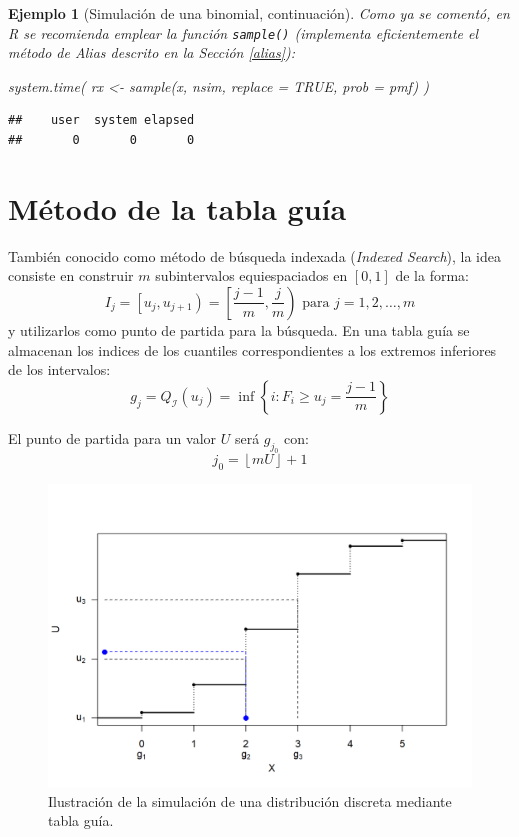 \documentclass[
]{book}
\newenvironment{Shaded}{\begin{snugshade}}{\end{snugshade}}
\newcommand{\AttributeTok}[1]{\textcolor[rgb]{0.77,0.63,0.00}{#1}}
\newcommand{\ConstantTok}[1]{\textcolor[rgb]{0.00,0.00,0.00}{#1}}
\newcommand{\FunctionTok}[1]{\textcolor[rgb]{0.00,0.00,0.00}{#1}}
\newcommand{\NormalTok}[1]{#1}
\newcommand{\OtherTok}[1]{\textcolor[rgb]{0.56,0.35,0.01}{#1}}
\theoremstyle{break}
\newtheorem{example}{Ejemplo}[chapter]
\theoremstyle{nonumberplain}
\begin{document}
\begin{example}[Simulación de una binomial, continuación]
Como ya se comentó, en R se recomienda emplear la función \texttt{sample()}
(implementa eficientemente el método de Alias descrito en la Sección \ref{alias}):

\begin{Shaded}
\begin{Highlighting}[]
\FunctionTok{system.time}\NormalTok{( rx }\OtherTok{\textless{}{-}} \FunctionTok{sample}\NormalTok{(x, nsim, }\AttributeTok{replace =} \ConstantTok{TRUE}\NormalTok{, }\AttributeTok{prob =}\NormalTok{ pmf) )}
\end{Highlighting}
\end{Shaded}

\begin{verbatim}
##    user  system elapsed 
##       0       0       0
\end{verbatim}

\end{example}

\hypertarget{muxe9todo-de-la-tabla-guuxeda}{%
\section{Método de la tabla guía}\label{muxe9todo-de-la-tabla-guuxeda}}

También conocido como método de búsqueda indexada (\emph{Indexed Search}), la idea consiste en construir \(m\) subintervalos equiespaciados en \([0,1]\) de la forma:
\[I_{j}=\left[ u_{j},u_{j+1}\right) =\left[ \frac{j-1}{m},\frac{j}{m}\right) 
\text{ para }j=1,2,\ldots ,m\]
y utilizarlos como punto de partida para la búsqueda.
En una tabla guía se almacenan los indices de los cuantiles correspondientes a los extremos inferiores de los intervalos:
\[g_{j}=Q_{\mathcal{I}}(u_{j})=\inf \left\{ i:F_{i}\geq u_{j}=\frac{j-1}{m}\right\}\]

El punto de partida para un valor \(U\) será \(g_{j_{0}}\) con:
\[j_{0}=\left\lfloor mU\right\rfloor +1\]

\begin{figure}[!htb]

{\centering \includegraphics[width=0.8\linewidth]{images/tabla-sim} 

}

\caption{Ilustración de la simulación de una distribución discreta mediante tabla guía.}\label{fig:tabla-movie}
\end{figure}
\end{document}
